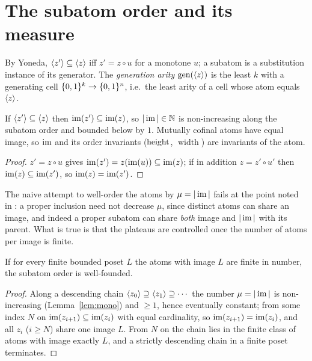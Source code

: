 
\section{The subatom order and its measure}

By Yoneda, $\langle z' \rangle\subseteq\langle z \rangle$ iff $z'=z\circ u$ for a monotone
$u$; a subatom is a substitution instance of its generator.  The
\emph{generation arity} $\operatorname{gen}(\langle z \rangle)$ is the least $k$ with a
generating cell $\{0,1\}^k\to\{0,1\}^n$, i.e.\ the least arity of a cell whose atom
equals $\langle z \rangle$.

\begin{lem}\label{lem:mono}
  If $\langle z' \rangle\subseteq\langle z \rangle$ then $\operatorname{im}(z')\subseteq\operatorname{im}(z)$, so
  $|\operatorname{im}|\in\mathbb N$ is non-increasing along the subatom order and
  bounded below by $1$.  Mutually cofinal atoms have equal image, so
  $\operatorname{im}$ and its order invariants ($\operatorname{height}$, $\operatorname{width}$) are
  invariants of the atom.
\end{lem}
\begin{proof}
  $z'=z\circ u$ gives $\operatorname{im}(z')=z(\operatorname{im}(u))\subseteq\operatorname{im}(z)$; if in addition
  $z=z'\circ u'$ then $\operatorname{im}(z)\subseteq\operatorname{im}(z')$, so $\operatorname{im}(z)=\operatorname{im}(z')$.
\end{proof}

The naive attempt to well-order the atoms by $\mu=|\operatorname{im}|$ fails at the
point noted in \cite{PaperW}: a proper inclusion need not decrease $\mu$,
since distinct atoms can share an image, and indeed a proper subatom can
share \emph{both} image and $|\operatorname{im}|$ with its parent.  What is true is
that the plateaus are controlled once the number of atoms per image is
finite.

\begin{prop}\label{prop:reduce}
  If for every finite bounded poset $L$ the atoms with image $L$ are
  finite in number, the subatom order is well-founded.
\end{prop}
\begin{proof}
  Along a descending chain $\langle z_0 \rangle\supseteq\langle z_1 \rangle\supseteq\cdots$
  the number $\mu=|\operatorname{im}|$ is non-increasing (Lemma~\ref{lem:mono}) and
  $\ge1$, hence eventually constant; from some index $N$ on
  $\operatorname{im}(z_{i+1})\subseteq\operatorname{im}(z_i)$ with equal cardinality, so
  $\operatorname{im}(z_{i+1})=\operatorname{im}(z_i)$, and all $z_i$ ($i\ge N$) share one image $L$.
  From $N$ on the chain lies in the finite class of atoms with image
  exactly $L$, and a strictly descending chain in a finite poset
  terminates.
\end{proof}

